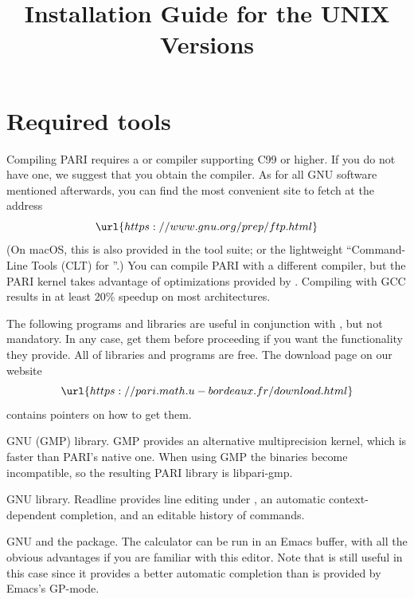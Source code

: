 %
%
\def\TITLE{Installing Pari/GP}

\def\tocwrite#1{}
\title{Installation Guide for the UNIX Versions}{}

\section{Required tools}

Compiling PARI requires a  or  compiler supporting C99 or
higher. If you do
not have one, we suggest that you obtain the  compiler. As for
all GNU software mentioned afterwards, you can find the most convenient site
to fetch  at the address
$$\url{https://www.gnu.org/prep/ftp.html}$$
%
(On macOS, this is also provided in the  tool suite;
or the lightweight ``Command-Line Tools (CLT) for ''.) You can
compile PARI with a different compiler, but the PARI kernel takes advantage
of optimizations provided by . Compiling with GCC results in at least
20\% speedup on most architectures.

 The following programs and libraries
are useful in conjunction with , but not mandatory. In any case, get them
before proceeding if you want the functionality they provide. All of libraries
and programs are free. The download page on our website
$$
\url{https://pari.math.u-bordeaux.fr/download.html}
$$
contains pointers on how to get them.

  \item GNU  (GMP) library. GMP provides an alternative multiprecision
kernel, which is faster than PARI's native one. When using GMP the
binaries become incompatible, so the resulting PARI library  is libpari-gmp.

  \item GNU  library. Readline provides line editing under
, an automatic context-dependent completion, and an editable history
of commands.

  \item GNU  and the  package. The 
calculator can be run in an Emacs buffer, with all the obvious advantages if
you are familiar with this editor. Note that  is still useful
in this case since it provides a better automatic completion than is provided
by Emacs's GP-mode.

